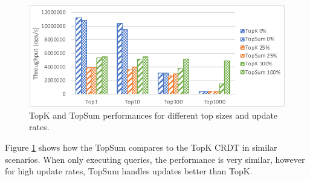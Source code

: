 \documentclass{vldb}
\newcommand{\grumbler}[2]{{\color{red}{\bf #1:} #2}}
\renewcommand{\grumbler}[2]{}
\newcommand{\andre}[1]{\grumbler{andre}{#1}}
\begin{document}

\begin{figure}
	\centering
	\includegraphics[width=.95\linewidth]{TopKVSTopSum_cut}
	\caption{TopK and TopSum performances for different top sizes and update rates.}
	\label{fig:TopkVSTopsum}
\end{figure}

Figure \ref{fig:TopkVSTopsum} shows how the TopSum compares to the TopK CRDT in similar scenarios.
When only executing queries, the performance is very similar, however for high update rates, TopSum handles updates better than TopK.
\andre{TODO: I have to check why this is happening... some guesses: 1- TopSum doesn't have removes but rather incs/subs, so less elements being removed/created from each set (but still, some should when moved between top and not-top) ; 2 - topK has tombstones, topSum does not (but should be okay as it is only 1 timestamp per element) ; 3 - TopSum uses pointers to structures for the elements while TopK uses structures ; 4 - some other reason? Like different behaviour? I don't know. Maybe I need to test with a Map or Set CRDT. But even so it is odd...}
\end{document}
